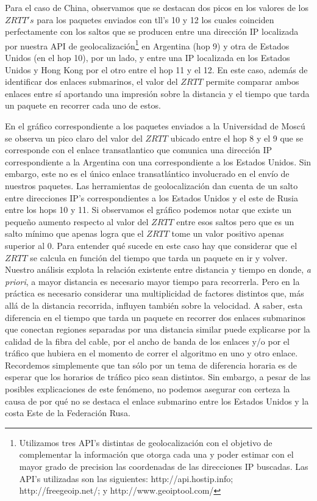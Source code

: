 Para el caso de China, observamos que se destacan dos picos en los valores de los $ZRTT's$ para los paquetes enviados con tll's 10 y 12 los cuales coinciden perfectamente con los saltos que se producen entre una dirección IP localizada por nuestra API de geolocalización\footnote{Utilizamos tres API's distintas de geolocalización con el objetivo de complementar la información que otorga cada una y poder estimar con el mayor grado de precision las coordenadas de las direcciones IP buscadas. Las API's utilizadas son las siguientes: http://api.hostip.info; http://freegeoip.net/; y http://www.geoiptool.com/} en Argentina (hop 9) y otra de Estados Unidos (en el hop 10), por un lado, y entre una IP localizada en los Estados Unidos y Hong Kong por el otro entre el hop 11 y el 12. En este caso, además de identificar dos enlaces submarinos, el valor del $ZRTT$ permite comparar ambos enlaces entre sí aportando una impresión sobre la distancia y el tiempo que tarda un paquete en recorrer cada uno de estos.

En el gráfico correspondiente a los paquetes enviados a la Universidad de Moscú se observa un pico claro del valor del $ZRTT$ ubicado entre el hop 8 y el 9 que se corresponde con el enlace transatlantico que comunica una dirección IP correspondiente a la Argentina con una correspondiente a los Estados Unidos. Sin embargo, este no es el único enlace transatlántico involucrado en el envío de nuestros paquetes. Las herramientas de geolocalización dan cuenta de un salto entre direcciones IP's correspondientes a los Estados Unidos y el este de Rusia entre los hops 10 y 11. Si observamos el gráfico podemos notar que existe un pequeño aumento respecto al valor del $ZRTT$ entre esos saltos pero que es un salto mínimo que apenas logra que el $ZRTT$ tome un valor positivo apenas superior al 0. Para entender qué sucede en este caso hay que considerar que el $ZRTT$ se calcula en función del tiempo que tarda un paquete en ir y volver. Nuestro análisis explota la relación existente entre distancia y tiempo en donde, \textit{a priori}, a mayor distancia es necesario mayor tiempo para recorrerla. Pero en la práctica es necesario considerar una multiplicidad de factores distintos que, más allá de la distancia recorrida, influyen también sobre la velocidad. A saber, esta diferencia en el tiempo que tarda un paquete en recorrer dos enlaces submarinos que conectan regiones separadas por una distancia similar puede explicarse por la calidad de la fibra del cable, por el ancho de banda de los enlaces y/o por el tráfico que hubiera en el momento de correr el algoritmo en uno y otro enlace. Recordemos simplemente que tan sólo por un tema de diferencia horaria es de esperar que los horarios de tráfico pico sean distintos. Sin embargo, a pesar de las posibles explicaciones de este fenómeno, no podemos asegurar con certeza la causa de por qué no se destaca el enlace submarino entre los Estados Unidos y la costa Este de la Federación Rusa.

